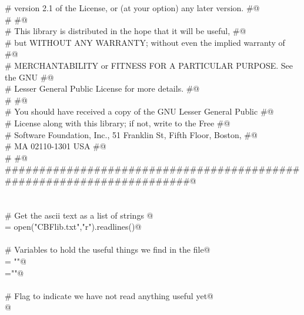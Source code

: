 \documentclass[10pt,a4paper,twoside,notitlepage]{article}
\begin{document}
\begin{flushleft}
\begin{list}{}{}
\mbox{}\verb@# version 2.1 of the License, or (at your option) any later version. #@\\
\mbox{}\verb@#                                                                    #@\\
\mbox{}\verb@# This library is distributed in the hope that it will be useful,    #@\\
\mbox{}\verb@# but WITHOUT ANY WARRANTY; without even the implied warranty of     #@\\
\mbox{}\verb@# MERCHANTABILITY or FITNESS FOR A PARTICULAR PURPOSE.  See the GNU  #@\\
\mbox{}\verb@# Lesser General Public License for more details.                    #@\\
\mbox{}\verb@#                                                                    #@\\
\mbox{}\verb@# You should have received a copy of the GNU Lesser General Public   #@\\
\mbox{}\verb@# License along with this library; if not, write to the Free         #@\\
\mbox{}\verb@# Software Foundation, Inc., 51 Franklin St, Fifth Floor, Boston,    #@\\
\mbox{}\verb@# MA  02110-1301  USA                                                #@\\
\mbox{}\verb@#                                                                    #@\\
\mbox{}\verb@######################################################################@\\
\mbox{}\verb@@\\
\mbox{}\verb@@\\
\mbox{}\verb@# Get the ascii text as a list of strings @\\
\mbox{}\verb@lines = open("CBFlib.txt","r").readlines()@\\
\mbox{}\verb@@\\
\mbox{}\verb@# Variables to hold the useful things we find in the file@\\
\mbox{}\verb@docstring = "\n"@\\
\mbox{}\verb@name=""@\\
\mbox{}\verb@@\\
\mbox{}\verb@# Flag to indicate we have not read anything useful yet@\\
\mbox{}@\\
\mbox{}\verb@@\\
\mbox{}\verb@@\\

\end{list}
\end{flushleft}
\end{document}
